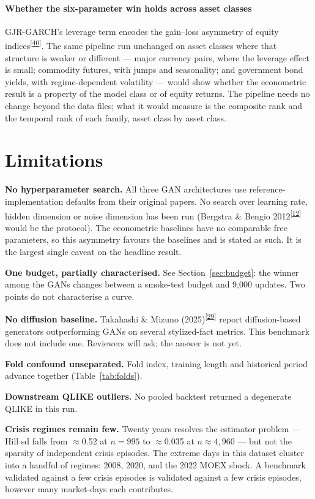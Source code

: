 \documentclass[11pt,a4paper]{article}
\makeatletter
\newcommand{\tcite}[1]{\textsuperscript{[\hyperlink{R:#1}{#1}]}}
\DeclareRobustCommand{\_}{\ifmmode\nfss@text{\textunderscore}\else\textunderscore\allowbreak\fi}
\makeatother
\begin{document}
\paragraph{Whether the six-parameter win holds across asset classes} GJR-GARCH's leverage term encodes the gain--loss asymmetry of equity indices\tcite{40}. The same pipeline run unchanged on asset classes where that structure is weaker or different --- major currency pairs, where the leverage effect is small; commodity futures, with jumps and seasonality; and government bond yields, with regime-dependent volatility --- would show whether the econometric result is a property of the model class or of equity returns. The pipeline needs no change beyond the data files; what it would measure is the composite rank and the temporal rank of each family, asset class by asset class.

\section{Limitations}
\label{sec:limitations}
\textbf{No hyperparameter search.} All three GAN architectures use reference-implementation defaults from their original papers. No search over learning rate, hidden dimension or noise dimension has been run (Bergstra \& Bengio 2012\tcite{12} would be the protocol). The econometric baselines have no comparable free parameters, so this asymmetry favours the baselines and is stated as such. It is the largest single caveat on the headline result.

\textbf{One budget, partially characterised.} See Section~\ref{sec:budget}: the winner among the GANs changes between a smoke-test budget and 9,000 updates. Two points do not characterise a curve.

\textbf{No diffusion baseline.} Takahashi \& Mizuno (2025)\tcite{29} report diffusion-based generators outperforming GANs on several stylized-fact metrics. This benchmark does not include one. Reviewers will ask; the answer is not yet.

\textbf{Fold confound unseparated.} Fold index, training length and historical period advance together (Table~\ref{tab:folds}).

\textbf{Downstream QLIKE outliers.} No pooled backtest returned a degenerate QLIKE in this run.

\textbf{Crisis regimes remain few.} Twenty years resolves the estimator problem --- Hill sd falls from $\approx$0.52 at $n=995$ to $\approx$0.035 at $n\approx4{,}960$ --- but not the sparsity of independent crisis episodes. The extreme days in this dataset cluster into a handful of regimes: 2008, 2020, and the 2022 MOEX shock. A benchmark validated against a few crisis episodes is validated against a few crisis episodes, however many market-days each contributes.
\end{document}

